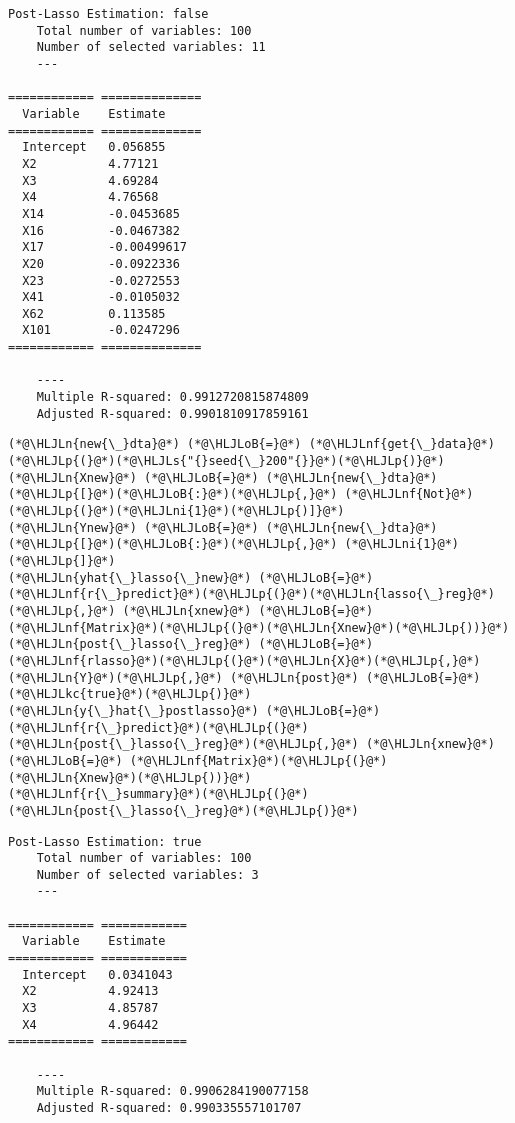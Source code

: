 \documentclass[12pt,a4paper]{article}
\newcommand{\HLJLkc}[1]{\textcolor[RGB]{59,151,46}{\textit{#1}}}
\newcommand{\HLJLn}[1]{#1}
\newcommand{\HLJLnf}[1]{\textcolor[RGB]{66,102,213}{#1}}
\newcommand{\HLJLs}[1]{\textcolor[RGB]{201,61,57}{#1}}
\newcommand{\HLJLni}[1]{\textcolor[RGB]{59,151,46}{#1}}
\newcommand{\HLJLoB}[1]{\textcolor[RGB]{102,102,102}{\textbf{#1}}}
\newcommand{\HLJLp}[1]{#1}
\begin{document}
\begin{lstlisting}
Post-Lasso Estimation: false
    Total number of variables: 100
    Number of selected variables: 11
    ---
     
============ ==============
  Variable    Estimate
============ ==============
  Intercept   0.056855
  X2          4.77121
  X3          4.69284
  X4          4.76568
  X14         -0.0453685
  X16         -0.0467382
  X17         -0.00499617
  X20         -0.0922336
  X23         -0.0272553
  X41         -0.0105032
  X62         0.113585
  X101        -0.0247296
============ ==============

    ----
    Multiple R-squared: 0.9912720815874809
    Adjusted R-squared: 0.9901810917859161
\end{lstlisting}


\begin{lstlisting}
(*@\HLJLn{new{\_}dta}@*) (*@\HLJLoB{=}@*) (*@\HLJLnf{get{\_}data}@*)(*@\HLJLp{(}@*)(*@\HLJLs{"{}seed{\_}200"{}}@*)(*@\HLJLp{)}@*)
(*@\HLJLn{Xnew}@*) (*@\HLJLoB{=}@*) (*@\HLJLn{new{\_}dta}@*)(*@\HLJLp{[}@*)(*@\HLJLoB{:}@*)(*@\HLJLp{,}@*) (*@\HLJLnf{Not}@*)(*@\HLJLp{(}@*)(*@\HLJLni{1}@*)(*@\HLJLp{)]}@*)
(*@\HLJLn{Ynew}@*) (*@\HLJLoB{=}@*) (*@\HLJLn{new{\_}dta}@*)(*@\HLJLp{[}@*)(*@\HLJLoB{:}@*)(*@\HLJLp{,}@*) (*@\HLJLni{1}@*)(*@\HLJLp{]}@*)
(*@\HLJLn{yhat{\_}lasso{\_}new}@*) (*@\HLJLoB{=}@*) (*@\HLJLnf{r{\_}predict}@*)(*@\HLJLp{(}@*)(*@\HLJLn{lasso{\_}reg}@*)(*@\HLJLp{,}@*) (*@\HLJLn{xnew}@*) (*@\HLJLoB{=}@*) (*@\HLJLnf{Matrix}@*)(*@\HLJLp{(}@*)(*@\HLJLn{Xnew}@*)(*@\HLJLp{))}@*)
(*@\HLJLn{post{\_}lasso{\_}reg}@*) (*@\HLJLoB{=}@*) (*@\HLJLnf{rlasso}@*)(*@\HLJLp{(}@*)(*@\HLJLn{X}@*)(*@\HLJLp{,}@*) (*@\HLJLn{Y}@*)(*@\HLJLp{,}@*) (*@\HLJLn{post}@*) (*@\HLJLoB{=}@*) (*@\HLJLkc{true}@*)(*@\HLJLp{)}@*)
(*@\HLJLn{y{\_}hat{\_}postlasso}@*) (*@\HLJLoB{=}@*) (*@\HLJLnf{r{\_}predict}@*)(*@\HLJLp{(}@*)(*@\HLJLn{post{\_}lasso{\_}reg}@*)(*@\HLJLp{,}@*) (*@\HLJLn{xnew}@*) (*@\HLJLoB{=}@*) (*@\HLJLnf{Matrix}@*)(*@\HLJLp{(}@*)(*@\HLJLn{Xnew}@*)(*@\HLJLp{))}@*)
(*@\HLJLnf{r{\_}summary}@*)(*@\HLJLp{(}@*)(*@\HLJLn{post{\_}lasso{\_}reg}@*)(*@\HLJLp{)}@*)
\end{lstlisting}

\begin{lstlisting}
Post-Lasso Estimation: true
    Total number of variables: 100
    Number of selected variables: 3
    ---
     
============ ============
  Variable    Estimate
============ ============
  Intercept   0.0341043
  X2          4.92413
  X3          4.85787
  X4          4.96442
============ ============

    ----
    Multiple R-squared: 0.9906284190077158
    Adjusted R-squared: 0.990335557101707
\end{lstlisting}
\end{document}

